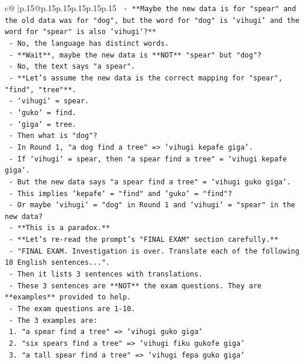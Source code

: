 \documentclass{article}
\begin{document}
{\begin{supertabular}{c@{$\;$}|p{.15\linewidth}@{}p{.15\linewidth}p{.15\linewidth}p{.15\linewidth}p{.15\linewidth}p{.15\linewidth}}
{{{\texttt{  {-} **Maybe the new data is for "spear" and the old data was for "dog", but the word for "dog" is `vihugi` and the word for "spear" is also `vihugi`?**} \\
\texttt{  {-} No, the language has distinct words.} \\
\texttt{  {-} **Wait**, maybe the new data is **NOT** "spear" but "dog"?} \\
\texttt{  {-} No, the text says "a spear".} \\
\texttt{  {-} **Let's assume the new data is the correct mapping for "spear", "find", "tree"**.} \\
\texttt{  {-} `vihugi` = spear.} \\
\texttt{  {-} `guko` = find.} \\
\texttt{  {-} `giga` = tree.} \\
\texttt{  {-} Then what is "dog"?} \\
\texttt{  {-} In Round 1, "a dog find a tree" => `vihugi kepafe giga`.} \\
\texttt{  {-} If `vihugi` = spear, then "a spear find a tree" = `vihugi kepafe giga`.} \\
\texttt{  {-} But the new data says "a spear find a tree" = `vihugi guko giga`.} \\
\texttt{  {-} This implies `kepafe` = "find" and `guko` = "find"?} \\
\texttt{  {-} Or maybe `vihugi` = "dog" in Round 1 and `vihugi` = "spear" in the new data?} \\
\texttt{  {-} **This is a paradox.**} \\
\texttt{  {-} **Let's re{-}read the prompt's "FINAL EXAM" section carefully.**} \\
\texttt{  {-} "FINAL EXAM. Investigation is over. Translate each of the following 10 English sentences...".} \\
\texttt{  {-} Then it lists 3 sentences with translations.} \\
\texttt{  {-} These 3 sentences are **NOT** the exam questions. They are **examples** provided to help.} \\
\texttt{  {-} The exam questions are 1{-}10.} \\
\texttt{  {-} The 3 examples are:} \\
\texttt{    1. "a spear find a tree" => `vihugi guko giga`} \\
\texttt{    2. "six spears find a tree" => `vihugi fiku gukofe giga`} \\
\texttt{    3. "a tall spear find a tree" => `vihugi fepa guko giga`} \\
}}}
\end{supertabular}}
\end{document}
